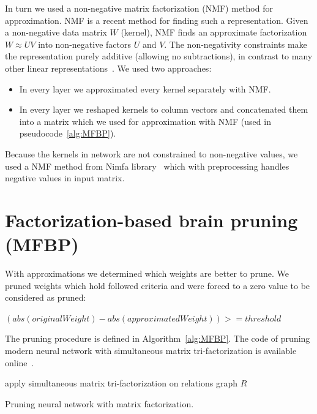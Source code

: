 \documentclass{article} %
\begin{document}
In turn we used a non-negative matrix factorization (NMF) method 
for approximation. NMF is
a recent method for finding such a representation. Given a non-negative data 
matrix $W$ (kernel), NMF finds
an approximate factorization $W \approx UV$ into non-negative factors $U$ and 
$V$. The non-negativity
constraints make the representation purely additive (allowing no subtractions), 
in contrast to many
other linear representations~\cite{hoyer2004non}. We used two approaches:
\begin{itemize}
\item In every layer we approximated every kernel separately with NMF. 
\item In every layer we reshaped 
kernels to column vectors and concatenated them into a matrix which we used for 
approximation with NMF (used in pseudocode~\ref{alg:MFBP}).
\end{itemize} Because the kernels in network are not constrained to non-negative 
values, we used a NMF method from Nimfa 
library~\citep{Zitnik2012} which with preprocessing handles negative values in 
input matrix.


\section{Factorization-based brain pruning (MFBP)}
With approximations we determined which weights are better to prune. We pruned
weights which hold followed criteria and were forced to a zero value to be
considered as pruned:

$(abs(originalWeight) - abs(approximatedWeight)) >= threshold$

The pruning procedure is defined in Algorithm~\ref{alg:MFBP}.
The code of pruning modern neural network with simultaneous matrix 
tri-factorization is available online~\cite{code}.

\begin{algorithm}[H]
\label{alg:MFBP}
 apply simultaneous matrix tri-factorization on relations graph $R$\;
 \caption{Pruning neural network with matrix factorization.}
 
\end{algorithm}
\end{document}
